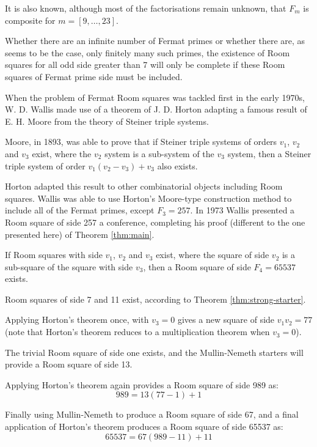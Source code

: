 It is also known, although most of the factorisations remain unknown, that $F_m$ is composite for $m = [9, \ldots, 23]$.

Whether there are an infinite number of Fermat primes or whether there are, as seems to be the case, only finitely many such primes, the existence of Room squares for all odd side greater than 7 will only be complete if these Room squares of Fermat prime side must be included.

When the problem of Fermat Room squares was tackled first in the early 1970s, W. D. Wallis made use of a theorem of J. D. Horton adapting a famous result of E. H. Moore from the theory of Steiner triple systems.

Moore, in 1893, was able to prove that if Steiner triple systems of orders $v_1$, $v_2$ and $v_3$ exist, where the $v_2$ system is a sub-system of the $v_3$ system, then a Steiner triple system of order $v_1(v_2 - v_3) + v_3$ also exists.

Horton
\cite{hortonVariationsThemeMoore1970}
adapted this result to other combinatorial objects including Room squares.
Wallis
\cite{wallisCombinatoricsRoomSquares2006}
was able to use Horton's Moore-type construction method to include all of the Fermat primes, except $F_3 = 257$.
In 1973 Wallis presented a Room square of side 257 a conference, completing his proof (different to the one presented here) of Theorem \ref{thm:main}.

\begin{example}
If Room squares with side $v_1$, $v_2$ and $v_3$ exist, where the square of side $v_2$ is a sub-square of the square with side $v_3$, then a Room square of side $F_4 = 65537$ exists.

Room squares of side 7 and 11 exist, according to Theorem \ref{thm:strong-starter}.

Applying Horton’s theorem once, with $v_3 = 0$ gives a new square of side $v_1v_2 = 77$ (note that Horton’s theorem reduces to a multiplication theorem when $v_3 = 0$).

The trivial Room square of side one exists, and the Mullin-Nemeth starters will provide a Room square of side 13.

Applying Horton’s theorem again provides a Room square of side 989 as:
\begin{equation*}
989 = 13(77 - 1) + 1
\end{equation*}

Finally using Mullin-Nemeth to produce a Room square of side 67, and a final application of Horton's theorem produces a Room square of side 65537 as:
\begin{equation*}
65537 = 67(989 - 11) + 11
\end{equation*}
\end{example}

